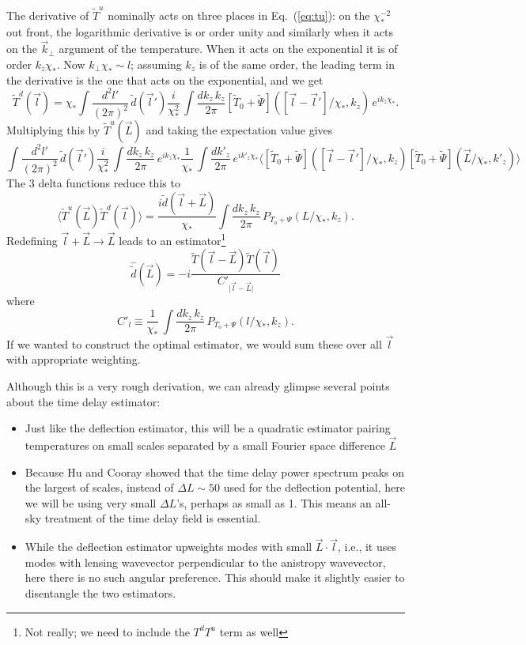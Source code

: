 \documentclass[prl,amsmath,amssymb,floatfix,superscriptaddress,nofootinbib,twocolumn]{revtex4-1}
\def\be{\begin{equation}}
\def\ee{\end{equation}}
\newcommand{\ec}[1]{Eq.~(\ref{eq:#1})}
\begin{document}
The derivative of $\tilde T^u$ nominally acts on three places in \ec{tu}: on the $\chi_*^{-2}$ out front, the logarithmic derivative is or order unity and similarly when it acts on the $\vec k_\perp$ argument of the temperature. When it acts on the exponential it is of order $k_z\chi_*$. Now $k_\perp\chi_*\sim l$; assuming $k_z$ is of the same order, the leading term in the derivative is the one that acts on the exponential, and we get
\begin{equation}
\tilde T^d(\vec l) = \chi_*\int \frac{d^2l'}{(2\pi)^2}\, \tilde d(\vec l')
\frac{i}{\chi_*^2}\, \int \frac{dk_z\,k_z}{2\pi}  [\tilde T_0+\tilde\Psi]([\vec l-\vec l']/\chi_*,k_z)\,e^{ik_z\chi_*}.
\end{equation}
Multiplying this by $\tilde T^u(\vec L)$ and taking the expectation value gives
\be
\int \frac{d^2l'}{(2\pi)^2}\, \tilde d(\vec l')
\frac{i}{\chi_*^2}\, \int \frac{dk_z\,k_z}{2\pi}  \,e^{ik_z\chi_*}
\frac{1}{\chi_*}\, \int \frac{dk'_z}{2\pi} \,e^{ik'_z\chi_*}
 \langle [\tilde T_0+\tilde\Psi]([\vec l-\vec l']/\chi_*,k_z)  [\tilde T_0+\tilde\Psi](\vec L/\chi_*,k'_z)\rangle
 \ee
 The 3 delta functions reduce this to
 \be
 \langle \tilde T^u(\vec L) \tilde T^d(\vec l) \rangle
 = \frac{i\tilde d(\vec l + \vec L)}{\chi_*} \int \frac{dk_z\,k_z}{2\pi} \, P_{T_o+\Psi}(L/\chi_*,k_z)
. \ee
 Redefining $\vec l + \vec L \rightarrow \vec L$ leads to an estimator\footnote{Not really; we need to include the $T^dT^u$ term as well}
 \be
 \hat{\tilde d}(\vec L) = -i \frac{\tilde T(\vec l-\vec L) \tilde T(\vec l)}{C'_{\vert\vec l-\vec L\vert}}
 \ee
 where
 \be
 C'_l \equiv  \frac{1}{\chi_*}\, \int \frac{dk_z\,k_z}{2\pi} \, P_{T_o+\Psi}(l/\chi_*,k_z)
 .\ee
If we wanted to construct the optimal estimator, we would sum these over all $\vec l$ with appropriate weighting.

Although this is a very rough derivation, we can already glimpse several points about the time delay estimator:
\begin{itemize}
\item Just like the deflection estimator, this will be a quadratic estimator pairing temperatures on small scales separated by a small Fourier space difference $\vec L$
\item Because Hu and Cooray showed that the time delay power spectrum peaks on the largest of scales, instead of $\Delta L\sim 50$ used for the deflection potential, here we will be using very small $\Delta L$'s, perhaps as small as 1. This means an all-sky treatment of the time delay field is essential.
\item While the deflection estimator upweights modes with small $\vec L\cdot \vec l$, i.e., it uses modes with lensing wavevector perpendicular to the anistropy wavevector, here there is no such angular preference. This should make it slightly easier to disentangle the two estimators.
\end{itemize}
\end{document}
